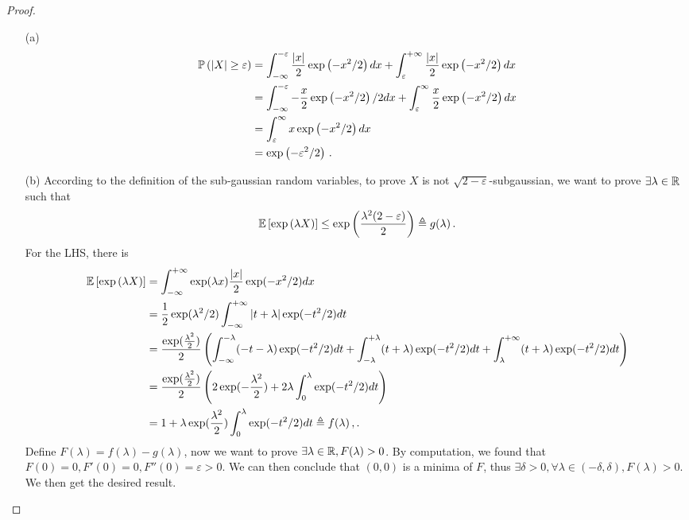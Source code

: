\begin{proof}
\begin{enumerate}
	\item[(a)] 
	\begin{align*}
		\mathbb{P} \left(\left| X \right|\ge \varepsilon\right) &=\int^{-\varepsilon}_{-\infty} 
		\frac{\left| x \right|}{2}\exp\left(-x^2/2\right) d x +  \int_{\varepsilon}^{+\infty} \frac{\left| x \right|}{2} \exp\left(-x^2/2\right) d x \\
		&=\int^{-\varepsilon}_{-\infty} -\frac{x}{2} \exp\left(-x^2/2\right)/2 d x +  \int_{\varepsilon}^\infty \frac{x}{2} \exp\left(-x^2/2\right) d x \\
		&= \int_{\varepsilon}^\infty x \exp\left(-x^2/2\right) d x \\
		&= \exp\left(-\varepsilon^2/2\right)\,.
	\end{align*}
	\item[(b)] 
	According to the definition of the sub-gaussian random variables, to prove $X$ is not $\sqrt{2-\varepsilon}$-subgaussian, we want to prove $\exists \lambda \in \mathbb{R}$ such that 
	\begin{align*}
		\mathbb{E} \left[\exp\left(\lambda X\right)\right] \le \exp\left(\frac{\lambda^2 (2-\varepsilon)}{2}\right) \triangleq g(\lambda) \,.
	\end{align*}
	For the LHS, there is
	\begin{align*}
		\mathbb{E} \left[\exp\left(\lambda X\right)\right] &= 	\int_{-\infty}^{+\infty} \exp(\lambda x) \frac{|x|}{2} \exp(-x^2/2) dx \\
		&= \frac{1}{2}\exp(\lambda^2/2)\int_{-\infty}^{+\infty} \left| t+\lambda \right| \exp(-t^2/2)dt \\
		&= \frac{\exp(\frac{\lambda^2}{2})}{2} \left(\int_{-\infty}^{-\lambda} (-t-\lambda) \exp(-t^2/2)dt+\int_{-\lambda}^{+\lambda} (t+\lambda) \exp(-t^2/2)dt + \int_{\lambda}^{+\infty}(t+\lambda) \exp(-t^2/2)dt\right) \\
		&= \frac{\exp(\frac{\lambda^2}{2})}{2} \left({2\exp(-\frac{\lambda^2}{2})} + 2\lambda \int_0^\lambda \exp(-t^2/2)dt \right) \\
		&= 1 + \lambda \exp(\frac{\lambda^2}{2})\int_{0}^{\lambda} \exp(-t^2/2) dt \triangleq f(\lambda) \,,.
	\end{align*}
	Define $F(\lambda) = f(\lambda) - g(\lambda)$, now we want to prove $\exists \lambda \in \mathbb{R}, F(\lambda)>0$. By computation, we found that $F(0)=0, F'(0) = 0, F''(0)=\varepsilon >0$. We can then conclude that $(0,0)$ is a minima of $F$, thus $\exists \delta>0, \forall \lambda\in (-\delta,\delta), F(\lambda)>0$. We then get the desired result. 
\end{enumerate}
\end{proof}



